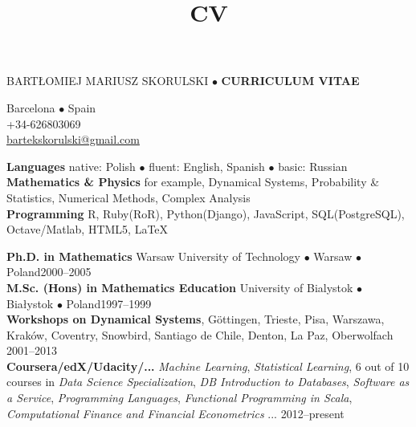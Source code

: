 \documentclass[a4paper, twoside]{scrreprt}
\title{CV}
\author{}
\date{}
\begin{document}
\noindent BARTŁOMIEJ MARIUSZ SKORULSKI $\bullet$ \textbf{CURRICULUM VITAE}
\vspace{-0.3cm}

\noindent\makebox[\linewidth]{\rule{\textwidth}{0.4pt}}

{\small
\noindent\llap{\FA \faHome\ \ } Barcelona $\bullet$ Spain\\
\noindent\llap{\FA \faMobilePhone\ \ \ }+34-626803069\\
\noindent\llap{\FA \faEnvelope\ \ }\href{mailto:bartekskorulski@gmail.com}{bartekskorulski@gmail.com}
}\\
\noindent\makebox[\linewidth]{\rule{\textwidth}{0.4pt}}

\vspace{0.1cm}


\noindent\llap{\FA \faComments\ \ }\textbf{Languages} native: Polish $\bullet$ fluent: English, Spanish $\bullet$ basic: Russian \\
\noindent\llap{\FA \faSuperscript\ \ }\textbf{Mathematics \& Physics} for example, Dynamical Systems, Probability \& Statistics, Numerical Methods, 
Complex Analysis\\
\noindent\llap{\FA \faKeyboard\ \ }\textbf{Programming} R, Ruby(RoR), Python(Django),  JavaScript, SQL(PostgreSQL), Octave/Matlab, HTML5, 
\LaTeX \\
\noindent\makebox[\linewidth]{\rule{\textwidth}{0.4pt}}

\vspace{0.1cm}
\noindent\textbf{Ph.D. in Mathematics} Warsaw University of Technology $\bullet$ Warsaw $\bullet$ Poland\hfill 2000--2005\\
\noindent\textbf{M.Sc. (Hons) in Mathematics Education} University of Bialystok $\bullet$ Białystok $\bullet$ Poland\hfill 1997--1999\\
\noindent\textbf{Workshops on Dynamical Systems}, Göttingen, Trieste, Pisa, Warszawa, Kraków, Coventry, Snowbird, Santiago de Chile, Denton, 
La Paz, Oberwolfach  \hfill 2001--2013\\
\noindent\textbf{Coursera/edX/Udacity/...} \emph{Machine Learning}, \emph{Statistical Learning}, 6 out of 10 courses in \emph{Data Science Specialization}, \emph{DB Introduction to Databases}, \emph{Software as a Service}, \emph{Programming Languages}, \emph{Functional Programming in Scala}, \emph{Computational Finance and Financial Econometrics} ... \hfill 2012--present\\
\noindent\makebox[\linewidth]{\rule{\textwidth}{0.4pt}}
\end{document}
